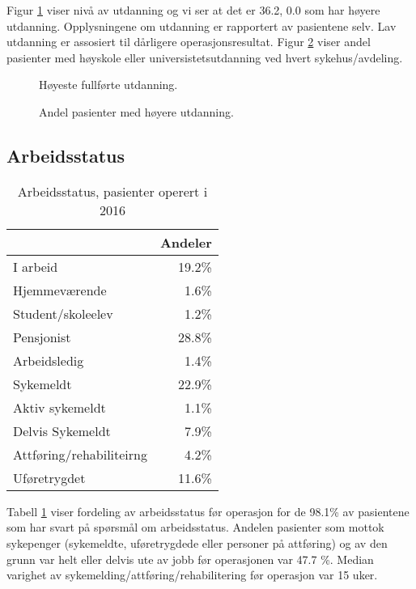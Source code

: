 \documentclass [norsk,a4paper,twoside]{article}\usepackage[]{graphicx}\usepackage[]{color}
\begin{document}
Figur \ref{fig:Utd} viser nivå av utdanning og vi ser at det er 36.2, 0.0 som har høyere utdanning. Opplysningene om utdanning er rapportert av pasientene selv. 
Lav utdanning er assosiert til dårligere operasjonsresultat. Figur \ref{fig:HoyUtdAvd} viser andel pasienter med høyskole eller universistetsutdanning ved hvert sykehus/avdeling.

\begin{figure}[ht]
\caption{\label{fig:Utd} Høyeste fullførte utdanning.}
\end{figure}

\begin{figure}[ht]
\caption{\label{fig:HoyUtdAvd} Andel pasienter med høyere utdanning.}
\end{figure}


\clearpage

\subsection{Arbeidsstatus}

\begin{table}[ht]
\centering
\begin{tabular}{lr}
  \hline
 & Andeler \\ 
  \hline
I arbeid & 19.2\% \\ 
  Hjemmeværende & 1.6\% \\ 
  Student/skoleelev & 1.2\% \\ 
  Pensjonist & 28.8\% \\ 
  Arbeidsledig & 1.4\% \\ 
  Sykemeldt & 22.9\% \\ 
  Aktiv sykemeldt & 1.1\% \\ 
  Delvis Sykemeldt & 7.9\% \\ 
  Attføring/rehabiliteirng & 4.2\% \\ 
  Uføretrygdet & 11.6\% \\ 
   \hline
\end{tabular}
\caption{Arbeidsstatus, pasienter operert i 2016} 
\label{tab:Arb}
\end{table}


Tabell \ref{tab:Arb} viser fordeling av arbeidsstatus før operasjon for de 98.1\% 
av pasientene som har svart på spørsmål om arbeidsstatus.
Andelen pasienter som mottok sykepenger (sykemeldte, uføretrygdede eller personer 
på attføring) og av den grunn var helt eller delvis ute av jobb før operasjonen var 
47.7 \%. 
Median varighet av sykemelding/attføring/rehabilitering  før operasjon var 
15 uker.
\end{document}
